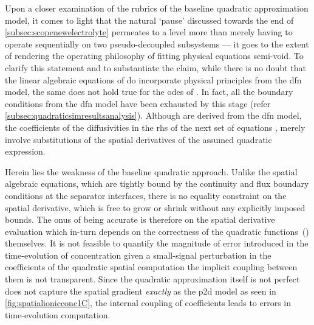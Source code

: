 Upon  a   closer  examination   of  the  rubrics   of  the   baseline  quadratic
approximation  model, it  comes  to  light that  the  natural `pause'  discussed
towards  the  end  of \cref{subsec:scopenewelectrolyte}  permeates  to  a  level
more  than  merely  having  to  operate  sequentially  on  two  pseudo-decoupled
subsystems  --- it  goes to  the extent  of rendering  the operating  philosophy
of  fitting  physical  equations  semi-void.   To  clarify  this  statement  and
to  substantiate   the  claim,  while  there   is  no  doubt  that   the  linear
algebraic   equations  of 
do    incorporate    physical    principles   from    the    \gls{dfn}    model,
the     same     does     not      hold     true     for     the     \glspl{ode}
of .   In  fact,
all   the   boundary   conditions   from   the   \gls{dfn}   model   have   been
exhausted   by  this   stage  (refer \cref{subsec:quadraticsimresultsanalysis}).
Although      are    derived
from     the      \gls{dfn}     model,      the     coefficients      of     the
diffusivities   in    the   \gls{rhs}   of    the   next   set    of   equations
\ie{} ,   merely
involve  substitutions  of the  spatial  derivatives  of the  assumed  quadratic
expression.

Herein lies the weakness of the  baseline quadratic approach. Unlike the spatial
algebraic equations, which are tightly bound by the continuity and flux boundary
conditions at the  separator interfaces, there is no equality  constraint on the
spatial  derivative, which  is free  to grow  or shrink  without any  explicitly
imposed  bounds.  The  onus  of  being accurate  is  therefore  on  the  spatial
derivative evaluation which in-turn depends  on the correctness of the quadratic
functions~()  themselves. It  is
not feasible to quantify the magnitude of error introduced in the time-evolution
of concentration  given a small-signal  perturbation in the coefficients  of the
quadratic spatial  computation \ie{} the  implicit coupling between them  is not
transparent. Since the quadratic approximation  itself is not perfect \ie{} does
not capture the  spatial gradient \emph{exactly} as the \gls{p2d}  model as seen
in \cref{fig:spatialionicconc1C}, the internal coupling of coefficients leads to
errors in time-evolution computation.

